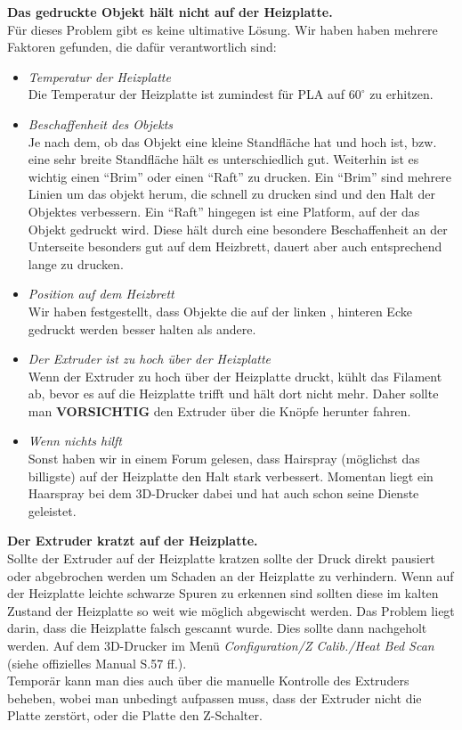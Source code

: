 \documentclass[11pt,a4paper]{scrartcl}
\begin{document}
\begin{description}
\item \textbf{Das gedruckte Objekt hält nicht auf der Heizplatte.}\\
Für dieses Problem gibt es keine ultimative Lösung. Wir haben haben mehrere Faktoren gefunden, die dafür verantwortlich sind:
\begin{itemize}
\item \textit{Temperatur der Heizplatte}\\
Die Temperatur der Heizplatte ist zumindest für PLA auf $60^\circ$ zu erhitzen.
\item \textit{Beschaffenheit des Objekts}\\
Je nach dem, ob das Objekt eine kleine Standfläche hat und hoch ist, bzw. eine sehr breite Standfläche hält es unterschiedlich gut. Weiterhin ist es wichtig einen \enquote{Brim} oder einen \enquote{Raft} zu drucken. Ein \enquote{Brim} sind mehrere Linien um das objekt herum, die schnell zu drucken sind und den Halt der Objektes verbessern. Ein \enquote{Raft} hingegen ist eine Platform, auf der das Objekt gedruckt wird. Diese hält durch eine besondere Beschaffenheit an der Unterseite besonders gut auf dem Heizbrett, dauert aber auch entsprechend lange zu drucken.
\item \textit{Position auf dem Heizbrett}\\
Wir haben festgestellt, dass Objekte die auf der linken , hinteren Ecke gedruckt werden besser halten als andere.
\item \textit{Der Extruder ist zu hoch über der Heizplatte}\\
Wenn der Extruder zu hoch über der Heizplatte druckt, kühlt das Filament ab, bevor es auf die Heizplatte trifft und hält dort nicht mehr. Daher sollte man \textbf{VORSICHTIG} den Extruder über die Knöpfe herunter fahren.
\item \textit{Wenn nichts hilft}\\
Sonst haben wir in einem Forum gelesen, dass Hairspray (möglichst das billigste) auf der Heizplatte den Halt stark verbessert. Momentan liegt ein Haarspray bei dem 3D-Drucker dabei und hat auch schon seine Dienste geleistet.
\end{itemize}
\vspace{10pt}

\item \textbf{Der Extruder kratzt auf der Heizplatte.}\\
Sollte der Extruder auf der Heizplatte kratzen sollte der Druck direkt pausiert oder abgebrochen werden um Schaden an der Heizplatte zu verhindern. Wenn auf der Heizplatte leichte schwarze Spuren zu erkennen sind sollten diese im kalten Zustand der Heizplatte so weit wie möglich abgewischt werden. Das Problem liegt darin, dass die Heizplatte falsch gescannt wurde. Dies sollte dann nachgeholt werden. Auf dem 3D-Drucker im Menü \textit{Configuration/Z Calib./Heat Bed Scan} (siehe offizielles Manual S.57 ff.).\\
Temporär kann man dies auch über die manuelle Kontrolle des Extruders beheben, wobei man unbedingt aufpassen muss, dass der Extruder nicht die Platte zerstört, oder die Platte den Z-Schalter.
\vspace{10pt}


\end{description}
\end{document}
